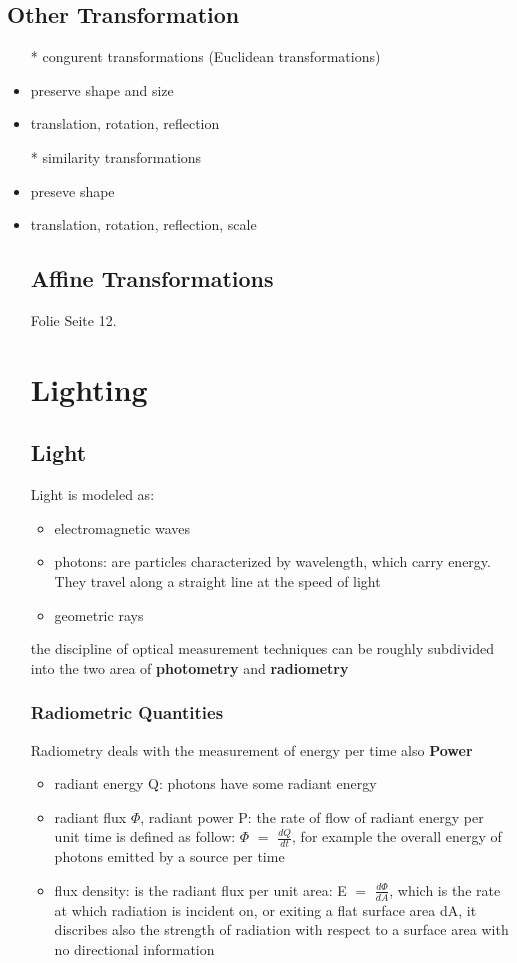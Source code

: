 \documentclass[12pt, a4paper]{article}
\begin{document}
\subsection{Other Transformation}
\begin{itemize}
  \item[*] congurent transformations (Euclidean transformations)
  \item preserve shape and size
  \item translation, rotation, reflection
  \item[*] similarity transformations
  \item preseve shape
  \item translation, rotation, reflection, scale

\subsection{Affine Transformations}
Folie Seite 12.

\section{Lighting}
\subsection{Light}
Light is modeled as: \begin{itemize}
  \item electromagnetic waves
  \item photons: are particles characterized by wavelength, which carry energy. They travel along a straight line at the speed of light
  \item geometric rays
\end{itemize}
the discipline of optical measurement techniques can be roughly subdivided into the two area of \textbf{photometry} and \textbf{radiometry}

\subsubsection{Radiometric Quantities}
Radiometry deals with the measurement of energy per time also \textbf{Power}
\begin{itemize}
  \item radiant energy Q: photons have some radiant energy
  \item radiant flux $\Phi$, radiant power P: the rate of flow of radiant energy per unit time is defined as follow: $\Phi$ $=$ $\frac{d Q}{d t}$, for example the overall energy of photons emitted by a source per time
  \item flux density: is the radiant flux per unit area: E $=$ $\frac{d \Phi}{d A}$, which is the rate at which radiation is incident on, or exiting a flat surface area dA, it discribes also the strength of radiation with respect to a surface area with no directional information
\end{itemize}





\end{itemize}
\end{document}
